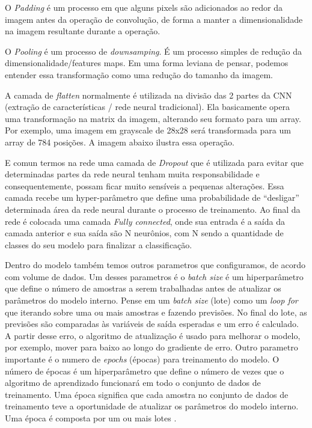 \documentclass[openright]{UFRGS} %
\begin{document}
O \textit{Padding} é um processo em que alguns pixels são adicionados ao redor da imagem antes da operação de convolução, de forma a manter a dimensionalidade na imagem resultante durante a operação.


O \textit{Pooling} é um processo de \textit{downsamping}. É um processo simples de redução da dimensionalidade/features maps. Em uma forma leviana de pensar, podemos entender essa transformação como uma redução do tamanho da imagem.


A camada de  \textit{flatten} normalmente é utilizada na divisão das 2 partes da CNN (extração de características / rede neural tradicional). Ela basicamente opera uma transformação na matrix da imagem, alterando seu formato para um array. Por exemplo, uma imagem em grayscale de 28x28 será transformada para um array de 784 posições. A imagem abaixo ilustra essa operação.

E comun termos na rede uma camada de \textit{Dropout} que é utilizada para evitar que determinadas partes da rede neural tenham muita responsabilidade e consequentemente, possam ficar muito sensíveis a pequenas alterações. Essa camada recebe um hyper-parâmetro que define uma probabilidade de “desligar” determinada área da rede neural durante o processo de treinamento. Ao final da rede é colocada uma camada \textit{Fully connected}, onde sua entrada é a saída da camada anterior e sua saída são N neurônios, com N sendo a quantidade de classes do seu modelo para finalizar a classificação.

Dentro do modelo também temos outros parametros que configuramos, de acordo com volume de dados. Um desses parametros é o \textit{batch size} é um hiperparâmetro que define o número de amostras a serem trabalhadas antes de atualizar os parâmetros do modelo interno. Pense em um \textit{batch size} (lote) como um \textit{loop for} que iterando sobre uma ou mais amostras e fazendo previsões. No final do lote, as previsões são comparadas às variáveis de saída esperadas e um erro é calculado. A partir desse erro, o algoritmo de atualização é usado para melhorar o modelo, por exemplo, mover para baixo ao longo do gradiente de erro. Outro parametro importante  é o numero de \textit{epochs} (épocas) para treinamento do modelo. O número de épocas é um hiperparâmetro que define o número de vezes que o algoritmo de aprendizado funcionará em todo o conjunto de dados de treinamento. Uma época significa que cada amostra no conjunto de dados de treinamento teve a oportunidade de atualizar os parâmetros do modelo interno. Uma época é composta por um ou mais lotes \cite{hentschel2016fine}.
\end{document}
